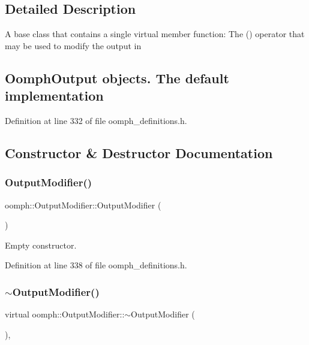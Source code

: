 \subsection{Detailed Description}
A base class that contains a single virtual member function\+: The () operator that may be used to modify the output in \subsection*{Oomph\+Output objects. The default implementation }

Definition at line 332 of file oomph\+\_\+definitions.\+h.



\subsection{Constructor \& Destructor Documentation}
\mbox{\label{classoomph_1_1OutputModifier_ab7e4b4d9e455cc93204160e70e2d50f6}} 
\subsubsection{\texorpdfstring{Output\+Modifier()}{OutputModifier()}}
{\footnotesize\ttfamily oomph\+::\+Output\+Modifier\+::\+Output\+Modifier (\begin{DoxyParamCaption}{ }\end{DoxyParamCaption})\hspace{0.3cm}{\ttfamily [inline]}}



Empty constructor. 



Definition at line 338 of file oomph\+\_\+definitions.\+h.

\mbox{\label{classoomph_1_1OutputModifier_aa8a586ce54aeae7d1d0d5a075dd5b172}} 
\subsubsection{\texorpdfstring{$\sim$\+Output\+Modifier()}{~OutputModifier()}}
{\footnotesize\ttfamily virtual oomph\+::\+Output\+Modifier\+::$\sim$\+Output\+Modifier (\begin{DoxyParamCaption}{ }\end{DoxyParamCaption})\hspace{0.3cm}{\ttfamily [inline]}, {\ttfamily [virtual]}}



